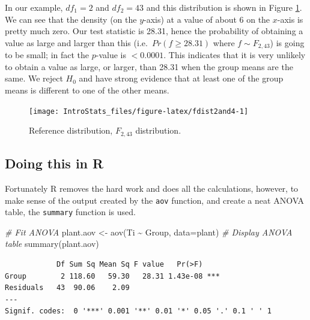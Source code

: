 \documentclass[
  oneside]{krantz}
\newenvironment{Shaded}{\begin{snugshade}}{\end{snugshade}}
\newcommand{\AttributeTok}[1]{\textcolor[rgb]{0.77,0.63,0.00}{#1}}
\newcommand{\CommentTok}[1]{\textcolor[rgb]{0.56,0.35,0.01}{\textit{#1}}}
\newcommand{\FunctionTok}[1]{\textcolor[rgb]{0.00,0.00,0.00}{#1}}
\newcommand{\NormalTok}[1]{#1}
\newcommand{\OtherTok}[1]{\textcolor[rgb]{0.56,0.35,0.01}{#1}}
\newcommand{\SpecialCharTok}[1]{\textcolor[rgb]{0.00,0.00,0.00}{#1}}
\begin{document}
In our example, \(df_1=2\) and \(df_2=43\) and this distribution is shown in Figure \ref{fig:fdist2and4}. We can see that the density (on the \(y\)-axis) at a value of about 6 on the \(x\)-axis is pretty much zero. Our test statistic is 28.31, hence the probability of obtaining a value as large and larger than this (i.e.~\(Pr(f \ge 28.31)\) where \(f \sim F_{2,43}\)) is going to be small; in fact the \(p\)-value is \(<0.0001\). This indicates that it is very unlikely to obtain a value as large, or larger, than 28.31 when the group means are the same. We reject \(H_0\) and have strong evidence that at least one of the group means is different to one of the other means.

\begin{figure}

{\centering \texttt{[image: IntroStats\_files/figure-latex/fdist2and4-1]} 

}

\caption{Reference distribution, $F_{2,43}$ distribution.}\label{fig:fdist2and4}
\end{figure}

\hypertarget{doing-this-in-r-16}{%
\subsection{Doing this in R}\label{doing-this-in-r-16}}

Fortunately R removes the hard work and does all the calculations, however, to make sense of the output created by the \texttt{aov} function, and create a neat ANOVA table, the \texttt{summary} function is used.

\begin{Shaded}
\begin{Highlighting}[]
\CommentTok{\# Fit ANOVA}
\NormalTok{plant.aov }\OtherTok{\textless{}{-}} \FunctionTok{aov}\NormalTok{(Ti }\SpecialCharTok{\textasciitilde{}}\NormalTok{ Group, }\AttributeTok{data=}\NormalTok{plant)}
\CommentTok{\# Display ANOVA table}
\FunctionTok{summary}\NormalTok{(plant.aov)}
\end{Highlighting}
\end{Shaded}

\begin{verbatim}
            Df Sum Sq Mean Sq F value   Pr(>F)    
Group        2 118.60   59.30   28.31 1.43e-08 ***
Residuals   43  90.06    2.09                     
---
Signif. codes:  0 '***' 0.001 '**' 0.01 '*' 0.05 '.' 0.1 ' ' 1
\end{verbatim}
\end{document}
